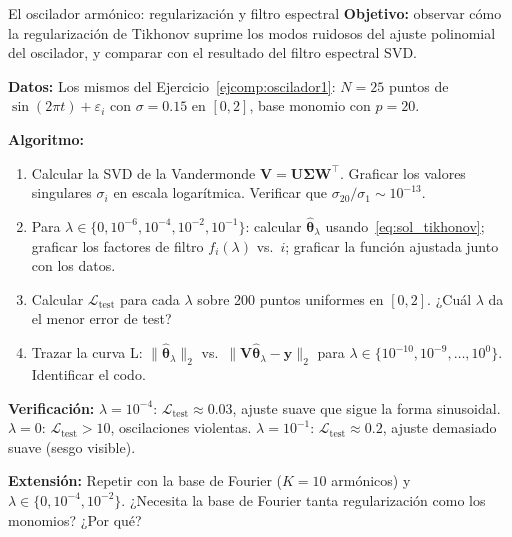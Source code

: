\begin{ejerciciocomp}{El oscilador armónico: regularización y filtro espectral}
\label{ejcomp:oscilador2}
\textbf{Objetivo:} observar cómo la regularización de Tikhonov suprime
los modos ruidosos del ajuste polinomial del oscilador, y comparar con
el resultado del filtro espectral SVD.

\medskip\noindent\textbf{Datos:}
Los mismos del Ejercicio~\ref{ejcomp:oscilador1}: $N = 25$ puntos de
$\sin(2\pi t) + \varepsilon_i$ con $\sigma = 0.15$ en $[0, 2]$, base
monomio con $p = 20$.

\medskip\noindent\textbf{Algoritmo:}
\begin{enumerate}
  \item Calcular la SVD de la Vandermonde $\bm{V} = \bm{U}\bm{\Sigma}
        \bm{W}^\top$. Graficar los valores singulares $\sigma_i$ en
        escala logarítmica. Verificar que $\sigma_{20}/\sigma_1 \sim
        10^{-13}$.
  \item Para $\lambda \in \{0, 10^{-6}, 10^{-4}, 10^{-2}, 10^{-1}\}$:
        calcular $\hat{\bm{\theta}}_\lambda$ usando~\eqref{eq:sol_tikhonov};
        graficar los factores de filtro $f_i(\lambda)$ vs.\ $i$;
        graficar la función ajustada junto con los datos.
  \item Calcular $\mathcal{L}_{\text{test}}$ para cada $\lambda$ sobre
        200 puntos uniformes en $[0, 2]$. ¿Cuál $\lambda$ da el menor
        error de test?
  \item Trazar la curva L: $\|\hat{\bm{\theta}}_\lambda\|_2$ vs.\
        $\|\bm{V}\hat{\bm{\theta}}_\lambda - \bm{y}\|_2$ para
        $\lambda \in \{10^{-10}, 10^{-9}, \ldots, 10^0\}$. Identificar
        el codo.
\end{enumerate}

\medskip\noindent\textbf{Verificación:}
$\lambda = 10^{-4}$: $\mathcal{L}_{\text{test}} \approx 0.03$,
ajuste suave que sigue la forma sinusoidal.
$\lambda = 0$: $\mathcal{L}_{\text{test}} > 10$, oscilaciones
violentas.
$\lambda = 10^{-1}$: $\mathcal{L}_{\text{test}} \approx 0.2$,
ajuste demasiado suave (sesgo visible).

\medskip\noindent\textbf{Extensión:}
Repetir con la base de Fourier ($K = 10$ armónicos) y $\lambda \in
\{0, 10^{-4}, 10^{-2}\}$. ¿Necesita la base de Fourier tanta
regularización como los monomios? ¿Por qué?
\end{ejerciciocomp}

